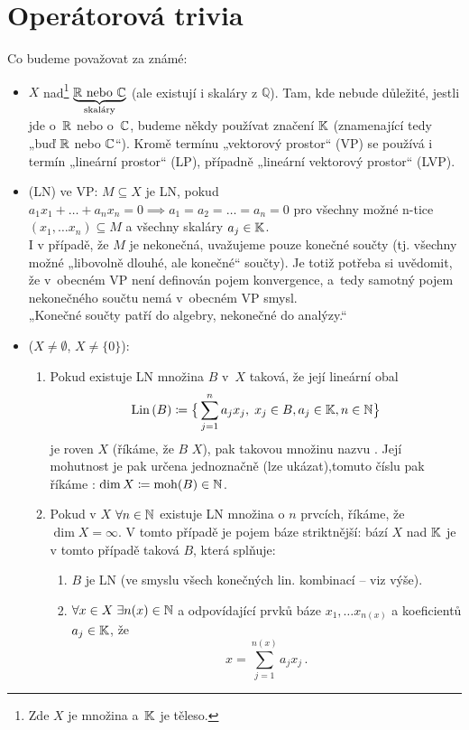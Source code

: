 \section{Operátorová trivia}

Co budeme považovat za známé:
\begin{itemize}
    \item {} $X$ nad\footnote{%
    Zde $X$ je množina a~$\mathbb{K}$ je těleso.}
    $\underbrace{\mathbb{R}\text{ nebo }\mathbb{C}}_{\text{skaláry}}$ (ale existují i skaláry z $\mathbb{Q}$). Tam, kde nebude důležité, jestli jde o~$\mathbb{R}$ nebo o~$\mathbb{C}$, budeme někdy používat značení $\mathbb{K}$ (znamenající tedy „buď $\mathbb{R}$ nebo $\mathbb{C}$“). Kromě termínu „vektorový prostor“ (VP) se používá i termín „lineární prostor“ (LP), případně „lineární vektorový prostor“ (LVP).
    
    \item {} (LN)  ve VP: $M \subseteq X$ je LN, pokud $a_1 x_1 + \dots + a_n x_n = 0 \implies a_1 = a_2 = \dots = a_n = 0$ pro všechny možné n-tice $(x_1, \dots x_n) \subseteq M$ a všechny skaláry $a_j \in \mathbb{K}$.
    \\[5pt]
    \Poznamka I v případě, že $M$ je nekonečná, uvažujeme pouze konečné součty (tj. všechny možné „libovolně dlouhé, ale konečné“ součty). Je totiž potřeba si uvědomit, že v~obecném VP není definován pojem konvergence, a~tedy samotný pojem nekonečného součtu nemá v~obecném VP smysl.
    \\[5pt]
    „Konečné součty patří do algebry, nekonečné do analýzy.“
    
    \item {} ($X \neq \emptyset$, $X \neq \{0\}$):
    \begin{enumerate}
        \item Pokud existuje  LN množina $B$ v~$X$ taková, že její lineární obal
        $$ \operatorname{Lin}\,(B) \coloneqq \big\{ \sum_{j=1}^n a_j x_j, \;  x_j \in B, a_j \in \mathbb{K}, n \in \mathbb{N} \big\} $$
        je roven $X$ (říkáme, že $B$  $X$), pak takovou množinu nazvu .
        Její mohutnost je pak určena jednoznačně (lze ukázat),tomuto číslu pak říkáme : $\dim X \coloneqq \operatorname{moh}(B) \in \mathbb{N}$.
        \item Pokud v $X$ $\forall n \in \mathbb{N}$ existuje LN množina o $n$ prvcích, říkáme, že $\dim X = \infty$. V tomto případě je pojem báze striktnější: bází $X$ nad $\mathbb{K}$ je v tomto případě taková  $B$, která splňuje:
        \begin{enumerate}
            \item $B$ je LN (ve smyslu všech konečných lin. kombinací – viz výše).
            \item $\forall x \in X \; \exists n(x) \in \mathbb{N}$ a odpovídající  prvků báze $x_1, \dots x_{n(x)}$ a koeficientů $a_j \in \mathbb{K}$, že
            $$ x = \sum_{j=1}^{n(x)} a_j x_j \,. $$
        \end{enumerate}
        

\end{enumerate}
\end{itemize}
